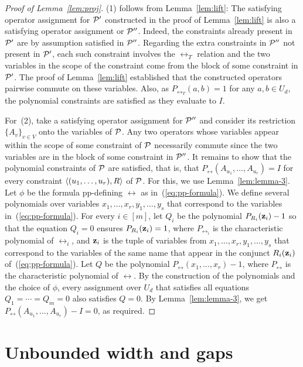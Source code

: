 \documentclass[11pt,letter]{article}
\begin{document}
\begin{proof}[Proof of Lemma~\ref{lem:proj}]
(1) follows from Lemma~\ref{lem:lift}: The satisfying operator assignment for ${\mathcal P}'$ constructed in the proof of Lemma~\ref{lem:lift} is also a satisfying operator assignment or ${\mathcal P}''$. Indeed, the constraints already present in ${\mathcal P}'$ are by assumption satisfied in ${\mathcal P}''$. Regarding the extra constraints in ${\mathcal P}''$ not present in ${\mathcal P}'$, each such constraint involves the $\rel_T$ relation and the two variables in the scope of the constraint come from the block of some constraint in ${\mathcal P}'$. The proof of Lemma~\ref{lem:lift} established that the constructed operators pairwise commute on these variables. Also, as $P_{\rel_T}(a,b)=1$ for any $a,b\in U_d$, the polynomial constraints are satisfied as they evaluate to $I$.

For~(2), take a satisfying operator assignment for ${\mathcal P}''$ and consider its restriction $\{A_v\}_{v\in V}$ onto the variables of ${\mathcal P}$. Any two operators whose variables appear within the scope of some constraint of ${\mathcal P}$ necessarily commute since the two variables are in the block of some constraint in ${\mathcal P}''$. It remains to show that the polynomial constraints of ${\mathcal P}$ are satisfied, that is, that $P_\rel(A_{u_1},\ldots,A_{u_r})=I$ for every constraint $\langle (u_1,\ldots,u_r),R \rangle$ of ${\mathcal P}$.
For this, we use Lemma~\ref{lem:lemma-3}.
Let $\phi$ be the formula pp-defining $\rel$ as in~(\ref{eq:pp-formula}). We
  define several polynomials over variables $x_1,\ldots,x_r,y_1,\ldots,y_s$ that
  correspond to the variables in~(\ref{eq:pp-formula}). For every $i\in [m]$,
  let $Q_i$ be the polynomial $P_{R_i}({\bf z}_i)-1$ so that the equation $Q_i=0$
  ensures $P_{R_i}({\bf z}_i)=1$, where $P_{\rel_i}$ is the characteristic
  polynomial of $\rel_i$, and ${\bf z}_i$ is the tuple of variables from
  $x_1,\ldots,x_r,y_1,\ldots,y_s$ that correspond to the variables of the same
  name that appear in the conjunct $R_i({\bf z}_i)$ of~(\ref{eq:pp-formula}).
Let $Q$ be the polynomial $P_\rel(x_1,\ldots,x_r)-1$, where $P_\rel$ is the characteristic polynomial of $\rel$. By the construction of the polynomials and the choice of $\phi$, every assignment over $U_d$ that satisfies all equations $Q_1=\cdots=Q_m=0$ also satisfies $Q=0$. By Lemma~\ref{lem:lemma-3}, we get $P_\rel(A_{u_1},\ldots,A_{u_r})-I=0$, as required.
\end{proof}

 

\section{Unbounded width and gaps}\label{sec:gap}
\end{document}
